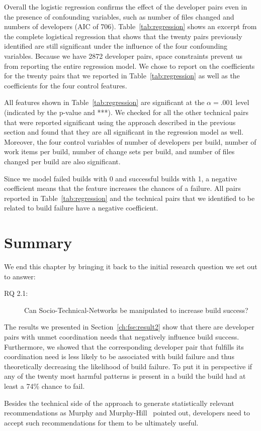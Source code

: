 Overall the logistic regression confirms the effect of the developer pairs
even in the presence of confounding variables, such as number of files changed
and numbers of developers (AIC of 706). 
Table~\ref{tab:regression} shows an excerpt from the complete logistical
regression that shows that the twenty pairs previously identified are still
significant under the influence of the four confounding variables. Because we have 2872 developer pairs, space constraints prevent us from reporting the entire regression model. We chose to report on the coefficients for the twenty pairs that we reported in Table~\ref{tab:regression} as well as the coefficients for the four control features.

All features shown in Table~\ref{tab:regression} are significant at the $\alpha=.001$ level (indicated by the p-value and ***).
We checked for all the other technical pairs that were reported significant using the approach described in the previous section and found that they are all significant in the regression model as well.
Moreover, the four control variables of number of developers per build, number
of work items per build, number of change sets per build, and number of files changed per build are also significant.

Since we model failed builds with 0 and successful builds with 1, a negative coefficient means that the feature increases the chances of a failure.
All pairs reported in Table~\ref{tab:regression} and the technical pairs that we identified to be related to build failure have a negative coefficient.
 


\section{Summary}
\label{sec:8:conclusions}
We end this chapter by bringing it back to the initial research question we set out to answer:
\begin{description}
  \item[RQ 2.1:] Can Socio-Technical-Networks be manipulated to increase build success? 
\end{description}

The results we presented in Section~\ref{ch:fse:result2} show that there are developer pairs with unmet coordination needs that negatively influence build success.
Furthermore, we showed that the corresponding developer pair that fulfills its coordination need is less likely to be associated with build failure and thus theoretically decreasing the likelihood of build failure.
To put it in perspective if any of the twenty most harmful patterns is present in a build the build had at least  a 74\% chance to fail.

Besides the technical side of the approach to generate statistically relevant recommendations as Murphy and Murphy-Hill~\cite{murphy:rsse:2010} pointed out, developers need to accept such recommendations for them to be ultimately useful.
